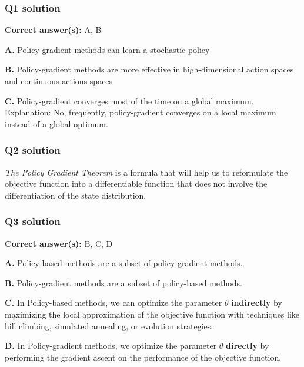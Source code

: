 \documentclass[11pt,a4paper]{article}
\begin{document}
\subsubsection{Q1 solution}\label{q1-solution}

\textbf{Correct answer(s):} A, B

\textbf{A.} Policy-gradient methods can learn a stochastic policy

\textbf{B.} Policy-gradient methods are more effective in high-dimensional action spaces and continuous actions spaces

\textbf{C.} Policy-gradient converges most of the time on a global maximum. Explanation: No, frequently, policy-gradient converges on a local maximum instead of a global optimum.

\subsubsection{Q2 solution}\label{q2-solution}

\emph{The Policy Gradient Theorem} is a formula that will help us to reformulate the objective function into a differentiable function that does not involve the differentiation of the state distribution.


\subsubsection{Q3 solution}\label{q3-solution}

\textbf{Correct answer(s):} B, C, D

\textbf{A.} Policy-based methods are a subset of policy-gradient methods.

\textbf{B.} Policy-gradient methods are a subset of policy-based methods.

\textbf{C.} In Policy-based methods, we can optimize the parameter \(\theta\) \textbf{indirectly} by maximizing the local approximation of the objective function with techniques like hill climbing, simulated annealing, or evolution strategies.

\textbf{D.} In Policy-gradient methods, we optimize the parameter \(\theta\) \textbf{directly} by performing the gradient ascent on the performance of the objective function.
\end{document}
